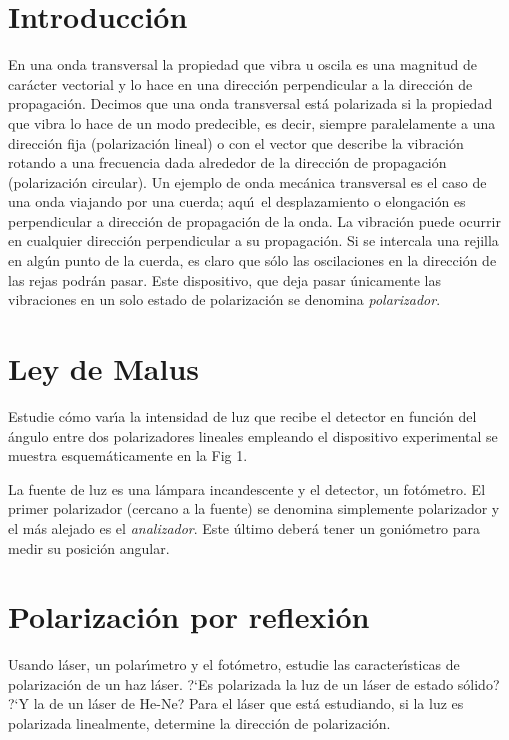 \documentclass[laboratorio]{guia}
\begin{document}
\maketitle

\section{Introducci\'on}
En una onda transversal la propiedad que vibra u oscila es una magnitud de 
car\'acter vectorial y lo hace en una direcci\'on perpendicular a la 
direcci\'on de propagaci\'on. Decimos que una onda transversal est\'a 
polarizada si la propiedad que vibra lo hace de un modo predecible, es decir,
siempre paralelamente a una direcci\'on fija (polarizaci\'on lineal) o con el
vector que describe la vibraci\'on rotando a una frecuencia dada alrededor de
la direcci\'on de propagaci\'on (polarizaci\'on circular). Un ejemplo de onda
mec\'anica transversal es el caso de una onda viajando por una cuerda; aqu\'\i\
el desplazamiento o elongaci\'on es perpendicular a direcci\'on de 
propagaci\'on de la onda. La vibraci\'on puede ocurrir en cualquier direcci\'on
perpendicular a su propagaci\'on. Si se intercala una rejilla en alg\'un punto
de la cuerda, es claro que s\'olo las oscilaciones en la direcci\'on de las 
rejas podr\'an pasar. Este dispositivo, que deja pasar \'unicamente las 
vibraciones en un solo estado de polarizaci\'on se denomina {\it polarizador}.

\section{Ley de Malus}
Estudie c\'omo var\'\i a la intensidad de luz que recibe el detector en 
funci\'on del \'angulo entre dos polarizadores lineales empleando el 
dispositivo experimental se muestra esquem\'aticamente en la Fig 1.

La fuente de luz es una l\'ampara incandescente y el detector, un fot\'ometro.
El primer polarizador (cercano a la fuente) se denomina simplemente polarizador
y el m\'as alejado es el {\it analizador}. Este \'ultimo deber\'a tener un 
goni\'ometro para medir su posici\'on angular.

\section{Polarizaci\'on por reflexi\'on}

Usando l\'aser, un polar\'\i metro y el fot\'ometro, estudie las 
caracter\'\i sticas de polarizaci\'on de un haz l\'aser. ?`Es polarizada la
luz de un l\'aser de estado s\'olido? ?`Y la de un l\'aser de He-Ne? Para el
l\'aser que est\'a estudiando, si la luz es polarizada linealmente, determine
la direcci\'on de polarizaci\'on.
\end{document}

